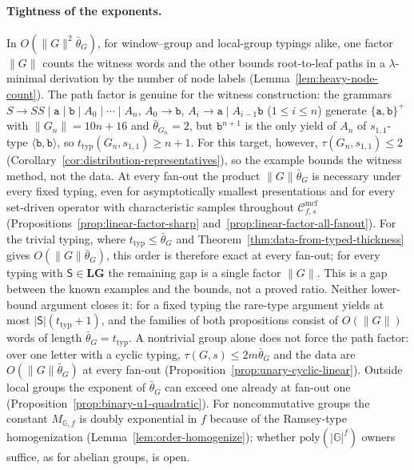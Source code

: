 \documentclass[11pt]{article}
\numberwithin{equation}{section}
\theoremstyle{plain}
\theoremstyle{definition}
\theoremstyle{remark}
\newcommand{\Cmcf}[2]{\mathcal{C}^{\mathrm{mcf}}_{#1,#2}}
\begin{document}
\paragraph{Tightness of the exponents.}
In $O(\|G\|^2\bar\theta_G)$, for window--group and local-group typings alike,
one factor $\|G\|$ counts the witness words and the other bounds root-to-leaf
paths in a $\lambda$-minimal derivation by the number of node labels
(Lemma~\ref{lem:heavy-node-count}).  The path factor is genuine for the witness
construction: the grammars $S\to SS\mid\mathtt a\mid\mathtt b\mid A_0\mid\cdots\mid A_n$,
$A_0\to\mathtt b$, $A_i\to\mathtt a\mid A_{i-1}\mathtt b$ ($1\le i\le n$) generate
$\{\mathtt a,\mathtt b\}^+$ with $\|G_n\|=10n+16$ and $\bar\theta_{G_n}=2$, but
$\mathtt b^{n+1}$ is the only yield of $A_n$ of $s_{1,1}$-type
$\langle\mathtt b,\mathtt b\rangle$, so $t_{\mathrm{typ}}(G_n,s_{1,1})\ge n+1$.  For this
target, however, $\tau(G_n,s_{1,1})\le2$
(Corollary~\ref{cor:distribution-representatives}), so the example bounds the
witness method, not the data.  At every fan-out the product $\|G\|\bar\theta_G$
is necessary under every fixed typing, even for asymptotically smallest
presentations and for every set-driven operator with characteristic samples
throughout $\Cmcf{f}{s}$ (Propositions~\ref{prop:linear-factor-sharp}
and~\ref{prop:linear-factor-all-fanout}).  For the trivial typing, where
$t_{\mathrm{typ}}\le\bar\theta_G$ and Theorem~\ref{thm:data-from-typed-thickness}
gives $O(\|G\|\bar\theta_G)$, this order is therefore exact at every fan-out;
for every typing with $\mathsf S\in\mathbf{LG}$ the remaining gap is a single
factor $\|G\|$.  This is a gap between the known examples and the bounds,
not a proved ratio.  Neither lower-bound argument closes it: for a fixed typing
the rare-type argument yields at most $|\mathsf S|(t_{\mathrm{typ}}+1)$, and the
families of both propositions consist of $O(\|G\|)$ words
of length $\bar\theta_G=t_{\mathrm{typ}}$.  A nontrivial group alone does not
force the path factor: over one letter with a cyclic typing,
$\tau(G,s)\le2m\bar\theta_G$ and the data are $O(\|G\|\bar\theta_G)$ at every
fan-out (Proposition~\ref{prop:unary-cyclic-linear}).  Outside local groups the
exponent of $\bar\theta_G$ can exceed one already at fan-out one
(Proposition~\ref{prop:binary-u1-quadratic}).  For
noncommutative groups the constant $M_{\mathbb G,f}$ is doubly exponential in $f$
because of the Ramsey-type homogenization (Lemma~\ref{lem:order-homogenize});
whether $\mathrm{poly}(|\mathbb G|^f)$ owners suffice, as for abelian groups, is open.
\end{document}
